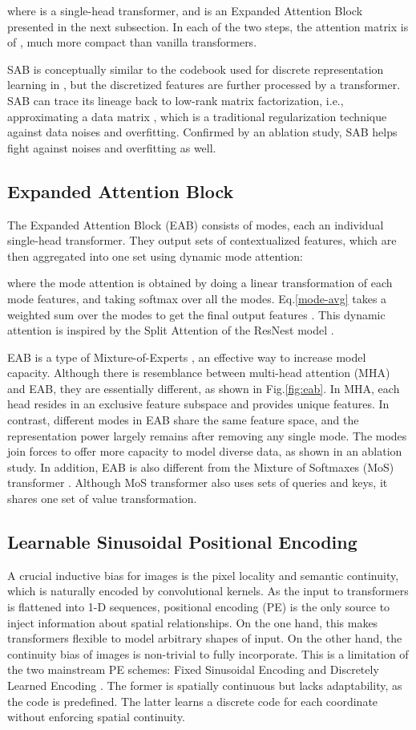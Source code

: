 \documentclass{article}
\begin{document}
where  is a single-head transformer, and  is an Expanded Attention Block presented in the next subsection.
In each of the two steps, the attention matrix is of , much more compact than vanilla transformers. 

SAB is conceptually similar to the codebook used for discrete representation learning in \cite{taming}, but 
the discretized features are further processed by a transformer.
SAB can trace its lineage back to low-rank matrix factorization, i.e., approximating a data matrix , which is a traditional regularization technique against data noises and overfitting. Confirmed by an ablation study, SAB helps fight against noises and overfitting as well.

\subsection{Expanded Attention Block}
The Expanded Attention Block (EAB) consists of  modes, each an individual single-head transformer. They output  sets of contextualized features, which are then aggregated into one set using dynamic mode attention:

where the mode attention  is obtained by doing a linear transformation of each mode features, and taking softmax over all the modes. Eq.\eqref{mode-avg} takes a weighted sum over the modes to get the final output features . This dynamic attention is inspired by the Split Attention of the ResNest model \cite{resnest}.

EAB is a type of Mixture-of-Experts \cite{sparse-moe}, an effective way to increase model capacity. Although there is resemblance between multi-head attention (MHA) and EAB, they are essentially different, as shown in Fig.\ref{fig:eab}. In MHA, each head resides in an exclusive feature subspace and provides unique features. In contrast, different modes in EAB share the same feature space, and the representation power largely remains after removing any single mode. The modes join forces to offer more capacity to model diverse data, as shown in an ablation study. In addition, EAB is also different from the  Mixture of Softmaxes (MoS) transformer \cite{fpt}. Although MoS transformer also uses  sets of queries and keys, it shares one set of value transformation.

\subsection{Learnable Sinusoidal Positional Encoding}
A crucial inductive bias for images is the pixel locality and semantic continuity, which is naturally encoded by convolutional kernels. As the input to transformers is flattened into 1-D sequences, positional encoding (PE) is the only source to inject information about spatial relationships. On the one hand, this makes transformers flexible to model arbitrary shapes of input. On the other hand, the continuity bias of images is non-trivial to fully incorporate. This is a limitation of the two mainstream PE schemes: Fixed Sinusoidal Encoding and Discretely Learned Encoding \cite{detr,vision-trans}. The former is spatially continuous but lacks adaptability, as the code is predefined. The latter learns a discrete code for each coordinate without enforcing spatial continuity.
\end{document}
